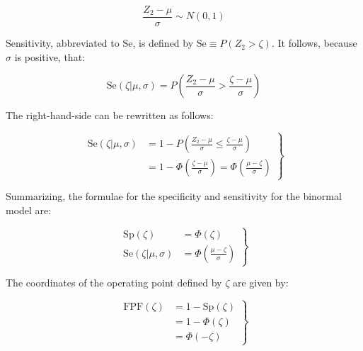 \documentclass[
]{book}
\begin{document}
\begin{equation*} 
\frac{Z_2-\mu}{\sigma}\sim N\left ( 0,1 \right )
\end{equation*}

Sensitivity, abbreviated to \(\text{Se}\), is defined by \(\text{Se} \equiv P\left ( Z_2 > \zeta \right )\). It follows, because \(\sigma\) is positive, that:

\begin{equation*} 
\text{Se}\left ( \zeta | \mu, \sigma \right ) = P\left ( \frac{Z_2-\mu}{\sigma} > \frac{\zeta-\mu}{\sigma} \right )
\end{equation*}

The right-hand-side can be rewritten as follows:

\begin{equation} 
\left. 
\begin{aligned}
\text{Se}\left ( \zeta | \mu, \sigma \right )&= 1 - P\left ( \frac{Z_2-\mu}{\sigma} \leq  \frac{\zeta-\mu}{\sigma} \right )\\
&=1-\Phi\left (  \frac{\zeta-\mu}{\sigma}\right )=\Phi\left (  \frac{\mu-\zeta}{\sigma}\right )
\end{aligned}
\right \}
\label{eq:binormal-model-sensitivity2}
\end{equation}

Summarizing, the formulae for the specificity and sensitivity for the binormal model are:

\begin{equation} 
\left. 
\begin{aligned}
\text{Sp}\left ( \zeta \right ) &= \Phi\left ( \zeta \right )\\
\text{Se}\left ( \zeta | \mu, \sigma \right ) &= \Phi\left (  \frac{\mu-\zeta}{\sigma}\right )
\end{aligned}
\right \}
\label{eq:binormal-model-se-sp}
\end{equation}

The coordinates of the operating point defined by \(\zeta\) are given by:

\begin{equation} 
\left. 
\begin{aligned}
\text{FPF}\left ( \zeta \right ) &= 1 - \text{Sp}\left ( \zeta \right ) \\
&= 1 - \Phi\left ( \zeta \right ) \\
&= \Phi\left ( -\zeta \right )
\end{aligned}
\right \}
\label{eq:binormal-model-fpf}
\end{equation}
\end{document}
